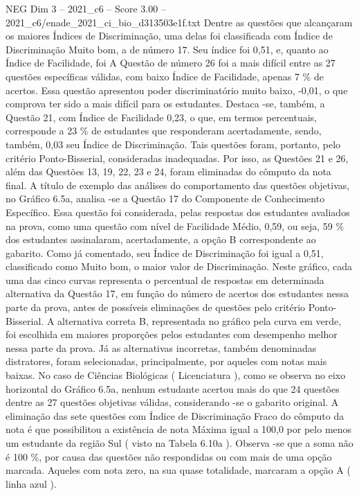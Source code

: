 \begin{textsample}{NEG Dim 3 – 2021\_c6 – Score 3.00 – 2021\_c6/enade\_2021\_ci\_bio\_d313503e1f.txt}
Dentre as questões que alcançaram os maiores Índices de Discriminação, uma delas foi classificada com Índice de Discriminação Muito bom, a de número 17.
Seu índice foi 0,51, e, quanto ao Índice de Facilidade, foi A Questão de número 26 foi a mais difícil entre as 27 questões específicas válidas, com baixo Índice de Facilidade, apenas 7 \% de acertos.
Essa questão apresentou poder discriminatório muito baixo, -0,01, o que comprova ter sido a mais difícil para os estudantes.
Destaca -se, também, a Questão 21, com Índice de Facilidade 0,23, o que, em termos percentuais, corresponde a 23 \% de estudantes que responderam acertadamente, sendo, também, 0,03 seu Índice de Discriminação.
Tais questões foram, portanto, pelo critério Ponto-Bisserial, consideradas inadequadas.
Por isso, as Questões 21 e 26, além das Questões 13, 19, 22, 23 e 24, foram eliminadas do cômputo da nota final.
A título de exemplo das análises do comportamento das questões objetivas, no Gráfico 6.5a, analisa -se a Questão 17 do Componente de Conhecimento Específico.
Essa questão foi considerada, pelas respostas dos estudantes avaliados na prova, como uma questão com nível de Facilidade Médio, 0,59, ou seja, 59 \% dos estudantes assinalaram, acertadamente, a opção B correspondente ao gabarito.
Como já comentado, seu Índice de Discriminação foi igual a 0,51, classificado como Muito bom, o maior valor de Discriminação.
Neste gráfico, cada uma das cinco curvas representa o percentual de respostas em determinada alternativa da Questão 17, em função do número de acertos dos estudantes nessa parte da prova, antes de possíveis eliminações de questões pelo critério Ponto-Bisserial.
A alternativa correta B, representada no gráfico pela curva em verde, foi escolhida em maiores proporções pelos estudantes com desempenho melhor nessa parte da prova.
Já as alternativas incorretas, também denominadas distratores, foram selecionadas, principalmente, por aqueles com notas mais baixas.
No caso de Ciências Biológicas ( Licenciatura ), como se observa no eixo horizontal do Gráfico 6.5a, nenhum estudante acertou mais do que 24 questões dentre as 27 questões objetivas válidas, considerando -se o gabarito original.
A eliminação das sete questões com Índice de Discriminação Fraco do cômputo da nota é que possibilitou a existência de nota Máxima igual a 100,0 por pelo menos um estudante da região Sul ( visto na Tabela 6.10a ).
Observa -se que a soma não é 100 \%, por causa das questões não respondidas ou com mais de uma opção marcada.
Aqueles com nota zero, na sua quase totalidade, marcaram a opção A ( linha azul ).

\end{textsample}
